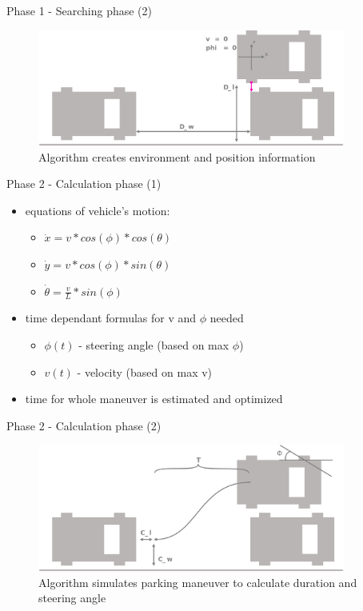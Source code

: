\documentclass[aspectratio=169]{beamer}
\begin{document}
  \begin{frame}{Phase 1 - Searching phase (2)}
  	\begin{figure} [ht]
  		\centering
  		\includegraphics[width=0.9\textwidth]{david_images/FindLot2.png}
  		\caption{\tiny Algorithm creates environment and position information}
	\end{figure}
  \end{frame}

  \begin{frame}{Phase 2 - Calculation phase (1)}
    	\begin{itemize}
  		\item<1-> equations of vehicle's motion:
  			\begin{itemize}
  				\item<2-> $\dot{x} = v * cos(\phi) * cos(\theta)$
  				\item<3-> $\dot{y} = v * cos(\phi) * sin(\theta)$
  				\item<4-> $\dot{\theta} = \frac{v}{L} * sin(\phi)$
  			\end{itemize}
  		\item<5-> time dependant formulas for v and $\phi$ needed
  			\begin{itemize}
  				\item<6-> $\phi(t)$ - steering angle (based on max $\phi$)
  				\item<7-> $v(t)$ - velocity (based on max v)
  			\end{itemize}
  		\item<8-> time for whole maneuver is estimated and optimized
  	\end{itemize}
  \end{frame}

  \begin{frame}{Phase 2 - Calculation phase (2)}
  	\begin{figure} [ht]
  		\centering
  		\includegraphics[width=0.9\textwidth]{david_images/Calculating.png}
  		\caption{\tiny Algorithm simulates parking maneuver to calculate duration and steering angle}
	\end{figure}
  \end{frame}
\end{document}
